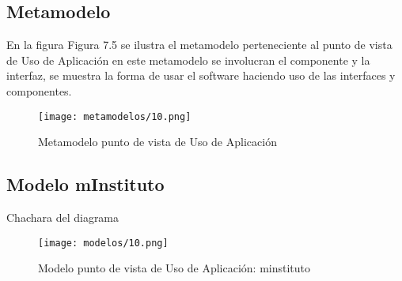   \subsection{Metamodelo}
  En la figura Figura 7.5 se ilustra el metamodelo perteneciente al punto de vista de Uso de Aplicación en este metamodelo se involucran el componente y la interfaz, se muestra la forma de usar el software haciendo uso de las interfaces y componentes.
  
  \begin{figure}[!h]
  	\centering
  	\texttt{[image: metamodelos/10.png]}
  	\captionsetup{width=.95\textwidth}
  	\caption{Metamodelo punto de vista de Uso de Aplicación}
  	\label{metamodelo10}
  \end{figure}
  
  \subsection{Modelo mInstituto}Chachara del diagrama
  \begin{figure}[!h]
  	\centering
  	\texttt{[image: modelos/10.png]}
  	\captionsetup{width=.95\textwidth}
  	\caption{Modelo punto de vista de Uso de Aplicación: minstituto}
  	\label{modelo10}
  \end{figure}